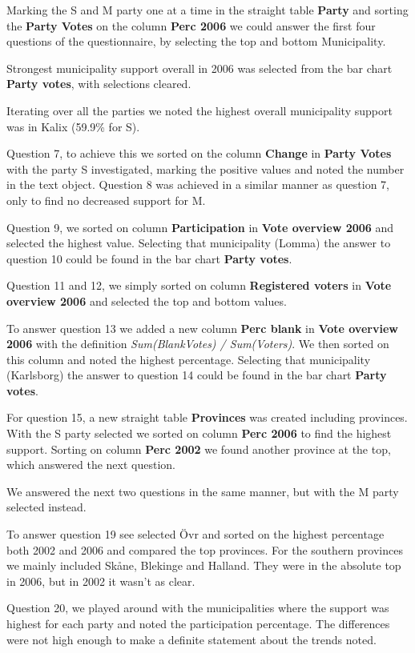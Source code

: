 \documentclass[a4paper]{article}
\begin{document}
Marking the S and M party one at a time in the straight table \textbf{Party} and
sorting the \textbf{Party Votes} on the column \textbf{Perc 2006} we could
answer the first four questions of the questionnaire, by selecting the top and
bottom Municipality.

Strongest municipality support overall in 2006 was selected from the bar chart
\textbf{Party votes}, with selections cleared.

Iterating over all the parties we noted the highest overall municipality support
was in Kalix (59.9\% for S).

Question 7, to achieve this we sorted on the column \textbf{Change} in
\textbf{Party Votes} with the party S investigated, marking the positive values
and noted the number in the text object.  Question 8 was achieved in a similar
manner as question 7, only to find no decreased support for M.

Question 9, we sorted on column \textbf{Participation} in \textbf{Vote overview
2006} and selected the highest value. Selecting that municipality (Lomma) the
answer to question 10 could be found in the bar chart \textbf{Party votes}.

Question 11 and 12, we simply sorted on column \textbf{Registered voters} in
\textbf{Vote overview 2006} and selected the top and bottom values.

To answer question 13 we added a new column \textbf{Perc blank} in \textbf{Vote
overview 2006} with the definition \textit{Sum(BlankVotes) / Sum(Voters)}. We
then sorted on this column and noted the highest percentage. Selecting that
municipality (Karlsborg) the answer to question 14 could be found in the bar
chart \textbf{Party votes}.

For question 15, a new straight table \textbf{Provinces} was created including
provinces. With the S party selected we sorted on column \textbf{Perc 2006} to
find the highest support. Sorting on column \textbf{Perc 2002} we found another
province at the top, which answered the next question.

We answered the next two questions in the same manner, but with the M party
selected instead.

To answer question 19 see selected \"Ovr and sorted on the highest percentage
both 2002 and 2006 and compared the top provinces. For the southern provinces we
mainly included Sk\aa ne, Blekinge and Halland. They were in the absolute top in
2006, but in 2002 it wasn't as clear.

Question 20, we played around with the municipalities where the support was
highest for each party and noted the participation percentage. The differences
were not high enough to make a definite statement about the trends noted.
\end{document}
